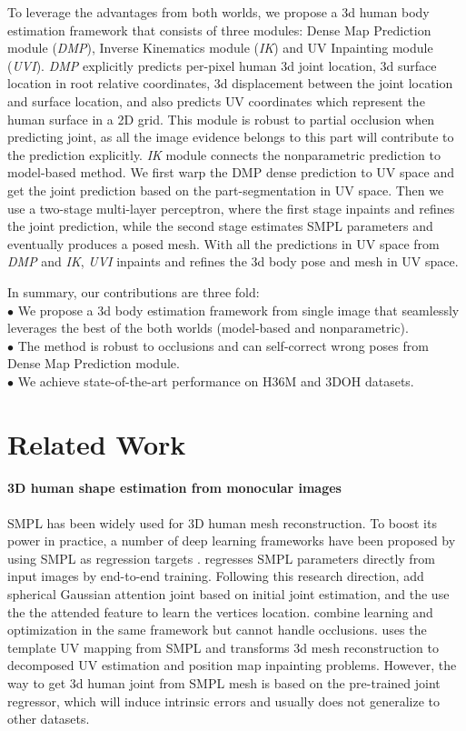 \documentclass[10pt,twocolumn,letterpaper]{article}
\begin{document}
To leverage the advantages from both worlds, we propose a 3d human body estimation framework that consists of three modules: Dense Map Prediction module (\textit{DMP}), Inverse Kinematics module (\textit{IK}) and UV Inpainting module (\textit{UVI}). \textit{DMP} explicitly predicts per-pixel human 3d joint location, 3d surface location in root relative coordinates, 3d displacement between the joint location and surface location, and also predicts UV coordinates which represent the human surface in a 2D grid. This module is robust to partial occlusion when predicting joint, as all the image evidence belongs to this part will contribute to the prediction explicitly. \textit{IK} module connects the nonparametric prediction to model-based method.  We first warp the DMP dense prediction to UV space and get the joint prediction based on the part-segmentation in UV space. Then we use a two-stage multi-layer perceptron, where the first stage inpaints and refines the joint prediction, while the second stage estimates SMPL parameters and eventually produces a posed mesh. With all the predictions in UV space from \textit{DMP} and \textit{IK}, \textit{UVI} inpaints and refines the 3d body pose and mesh in UV space.

\noindent In summary, our contributions are three fold:
\\
$\bullet$ We propose a 3d body estimation framework from single image that seamlessly leverages the best of the both worlds (model-based and nonparametric). 
\\
$\bullet$ The method is robust to occlusions and can self-correct wrong poses from Dense Map Prediction module.
\\
$\bullet$ We achieve state-of-the-art performance on H36M and 3DOH datasets. 



\section{Related Work}


\paragraph{3D human shape estimation from monocular images}  SMPL \cite{smpl} has been widely used for 3D human mesh reconstruction. To boost its power in practice, a number of deep learning frameworks have been proposed by using SMPL as regression targets \cite{HMR,spin, SMPL-X:2019,decomr,I2L,pchmr}. \cite{HMR} regresses SMPL parameters directly from input images by end-to-end training. Following this research direction, \cite{I2L} add spherical Gaussian attention joint based on initial joint estimation, and the use the the attended feature to learn the vertices location. \cite{spin} combine learning and optimization\cite{SMPL-X:2019} in the same framework but cannot handle occlusions. \cite{decomr} uses the template UV mapping from SMPL and transforms 3d mesh reconstruction to decomposed UV estimation and position map inpainting problems. However, the way to get 3d human joint from SMPL mesh is based on the pre-trained joint regressor, which will induce intrinsic errors and usually does not generalize to other datasets.
\end{document}
